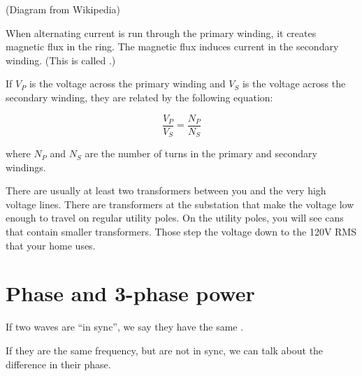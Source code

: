 (Diagram from Wikipedia)

When alternating current is run through the primary winding, it creates magnetic
flux in the ring. The magnetic flux induces current in the secondary
winding. (This is called .)

If $V_P$ is the voltage across the primary winding and $V_S$ is the
voltage across the secondary winding, they are related by the
following equation:

$$\frac{V_P}{V_S} = \frac{N_P}{N_S}$$

where $N_P$ and $N_S$ are the number of turns in the primary and
secondary windings.

There are usually at least two transformers between you and the very
high voltage lines. There are transformers at the substation that make
the voltage low enough to travel on regular utility poles. On the
utility poles, you will see cans that contain smaller
transformers. Those step the voltage down to the 120V RMS that your home uses.

\section{Phase and 3-phase power}

If two waves are ``in sync'', we say they have the same .


If they are the same frequency, but are not in sync, we can talk about
the difference in their phase.


